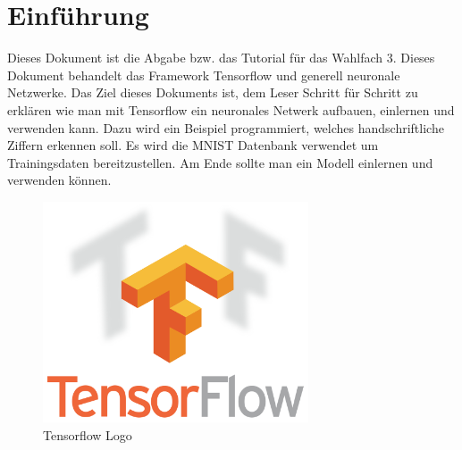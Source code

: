 \chapter{Einführung}
Dieses Dokument ist die Abgabe bzw. das Tutorial für das Wahlfach 3. Dieses Dokument behandelt das Framework Tensorflow und generell neuronale Netzwerke. Das Ziel dieses Dokuments ist, dem Leser Schritt für Schritt zu erklären wie man mit Tensorflow ein neuronales Netwerk aufbauen, einlernen und verwenden kann. Dazu wird ein Beispiel programmiert, welches handschriftliche Ziffern erkennen soll. Es wird die MNIST Datenbank verwendet um Trainingsdaten bereitzustellen. Am Ende sollte man ein Modell einlernen und verwenden können.

\begin{figure}[!ht]
\centering
\includegraphics[width=0.7\textwidth]{images/tensorflow}
\caption{Tensorflow Logo}
\label{fig:tensorflow}
\end{figure}
\label{cha:Introduction}


